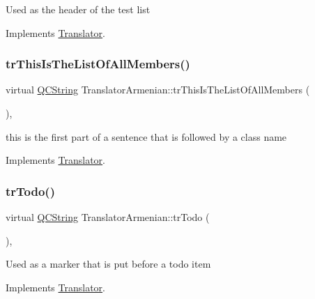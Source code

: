 Used as the header of the test list 

Implements \mbox{\hyperlink{class_translator}{Translator}}.

\mbox{\label{class_translator_armenian_a9d19c7b3790bcfcd59b26d7deb2af88c}} 
\subsubsection{\texorpdfstring{trThisIsTheListOfAllMembers()}{trThisIsTheListOfAllMembers()}}
{\footnotesize\ttfamily virtual \mbox{\hyperlink{class_q_c_string}{Q\+C\+String}} Translator\+Armenian\+::tr\+This\+Is\+The\+List\+Of\+All\+Members (\begin{DoxyParamCaption}{ }\end{DoxyParamCaption})\hspace{0.3cm}{\ttfamily [inline]}, {\ttfamily [virtual]}}

this is the first part of a sentence that is followed by a class name 

Implements \mbox{\hyperlink{class_translator}{Translator}}.

\mbox{\label{class_translator_armenian_a7190014f3dc6186c194cf64101efaeff}} 
\subsubsection{\texorpdfstring{trTodo()}{trTodo()}}
{\footnotesize\ttfamily virtual \mbox{\hyperlink{class_q_c_string}{Q\+C\+String}} Translator\+Armenian\+::tr\+Todo (\begin{DoxyParamCaption}{ }\end{DoxyParamCaption})\hspace{0.3cm}{\ttfamily [inline]}, {\ttfamily [virtual]}}

Used as a marker that is put before a todo item 

Implements \mbox{\hyperlink{class_translator}{Translator}}.

\mbox{\label{class_translator_armenian_a7109f841a998887fdc835ac7f3812392}} 
